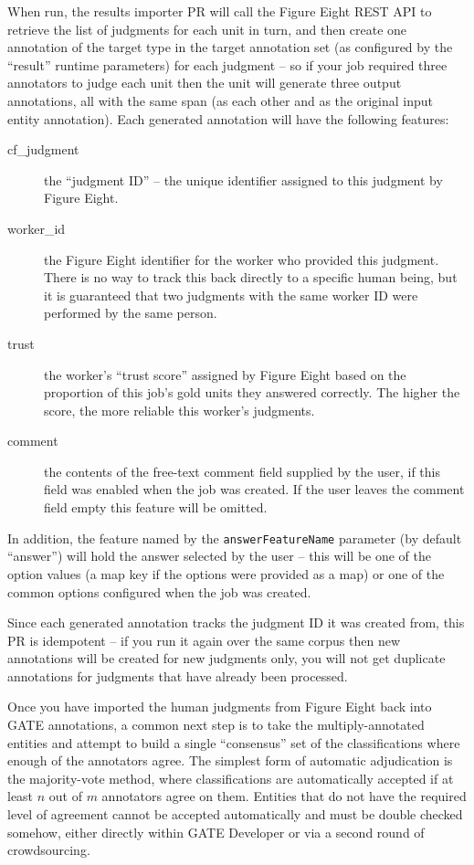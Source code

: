 When run, the results importer PR will call the Figure Eight REST API to
retrieve the list of judgments for each unit in turn, and then create one
annotation of the target type in the target annotation set (as configured by
the ``result'' runtime parameters) for each judgment -- so if your job required
three annotators to judge each unit then the unit will generate three output
annotations, all with the same span (as each other and as the original input
entity annotation).  Each generated annotation will have the following
features:
\begin{description}
\item[cf\_judgment] the ``judgment ID'' -- the unique identifier assigned to
  this judgment by Figure Eight.
\item[worker\_id] the Figure Eight identifier for the worker who provided this
  judgment.  There is no way to track this back directly to a specific human
  being, but it is guaranteed that two judgments with the same worker ID were
  performed by the same person.
\item[trust] the worker's ``trust score'' assigned by Figure Eight based on the
  proportion of this job's gold units they answered correctly.  The higher the
  score, the more reliable this worker's judgments.
\item[comment] the contents of the free-text comment field supplied by the
  user, if this field was enabled when the job was created.  If the user leaves
  the comment field empty this feature will be omitted.
\end{description}

In addition, the feature named by the \verb!answerFeatureName! parameter (by
default ``answer'') will hold the answer selected by the user -- this will be
one of the option values (a map key if the options were provided as a map) or
one of the common options configured when the job was created.

Since each generated annotation tracks the judgment ID it was created from,
this PR is idempotent -- if you run it again over the same corpus then new
annotations will be created for new judgments only, you will not get duplicate
annotations for judgments that have already been processed.



Once you have imported the human judgments from Figure Eight back into GATE
annotations, a common next step is to take the multiply-annotated entities and
attempt to build a single ``consensus'' set of the classifications where enough
of the annotators agree.  The simplest form of automatic adjudication is the
majority-vote method, where classifications are automatically accepted if at
least $n$ out of $m$ annotators agree on them.  Entities that do not have the
required level of agreement cannot be accepted automatically and must be double
checked somehow, either directly within GATE Developer or via a second round of
crowdsourcing.

